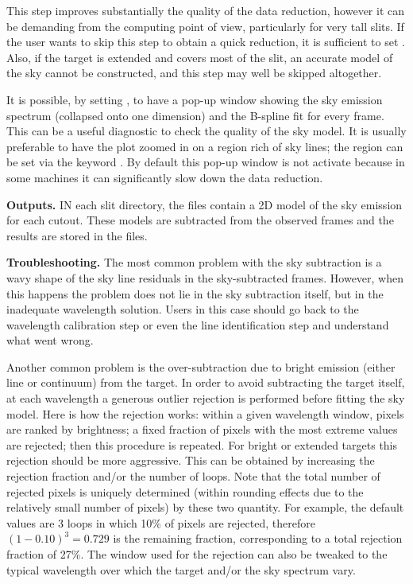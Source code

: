 \documentclass[a4paper]{article}
\begin{document}
\begin{sloppypar}
This step improves substantially the quality of the data reduction, however it can be demanding from the computing point of view, particularly for very tall slits. If the user wants to skip this step to obtain a quick reduction, it is sufficient to set . Also, if the target is extended and covers most of the slit, an accurate model of the sky cannot be constructed, and this step may well be skipped altogether.

It is possible, by setting , to have a pop-up window showing the sky emission spectrum (collapsed onto one dimension) and the B-spline fit for every frame. This can be a useful diagnostic to check the quality of the sky model. It is usually preferable to have the plot zoomed in on a region rich of sky lines; the region can be set via the keyword . By default this pop-up window is not activate because in some machines it can significantly slow down the data reduction.


\medskip
\noindent
\textbf{Outputs.} IN each slit directory, the  files contain a 2D model of the sky emission for each cutout. These models are subtracted from the observed frames and the results are stored in the  files.


\medskip
\noindent
\textbf{Troubleshooting.} The most common problem with the sky subtraction is a wavy shape of the sky line residuals in the sky-subtracted frames. However, when this happens the problem does not lie in the sky subtraction itself, but in the inadequate wavelength solution. Users in this case should go back to the wavelength calibration step or even the line identification step and understand what went wrong.

Another common problem is the over-subtraction due to bright emission (either line or continuum) from the target. In order to avoid subtracting the target itself, at each wavelength a generous outlier rejection is performed before fitting the sky model. Here is how the rejection works: within a given wavelength window, pixels are ranked by brightness; a fixed fraction of pixels with the most extreme values are rejected; then this procedure is repeated. For bright or extended targets this rejection should be more aggressive. This can be obtained by increasing the rejection fraction and/or the number of loops. Note that the total number of rejected pixels is uniquely determined (within rounding effects due to the relatively small number of pixels) by these two quantity. For example, the default values are 3 loops in which 10\% of pixels are rejected, therefore $(1-0.10)^3=0.729$ is the remaining fraction, corresponding to a total rejection fraction of 27\%. The window used for the rejection can also be tweaked to the typical wavelength over which the target and/or the sky spectrum vary.


\end{sloppypar}
\end{document}
